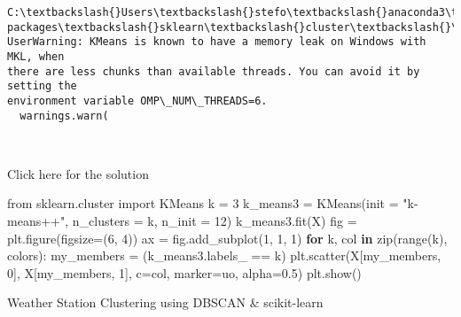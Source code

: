 \documentclass[11pt]{article}
\newenvironment{Shaded}{}{}
\newcommand{\KeywordTok}[1]{\textcolor[rgb]{0.00,0.44,0.13}{\textbf{{#1}}}}
\newcommand{\DecValTok}[1]{\textcolor[rgb]{0.25,0.63,0.44}{{#1}}}
\newcommand{\FloatTok}[1]{\textcolor[rgb]{0.25,0.63,0.44}{{#1}}}
\newcommand{\StringTok}[1]{\textcolor[rgb]{0.25,0.44,0.63}{{#1}}}
\newcommand{\NormalTok}[1]{{#1}}
\newcommand{\ImportTok}[1]{{#1}}
\newcommand{\ControlFlowTok}[1]{\textcolor[rgb]{0.00,0.44,0.13}{\textbf{{#1}}}}
\newcommand{\OperatorTok}[1]{\textcolor[rgb]{0.40,0.40,0.40}{{#1}}}
\newcommand{\BuiltInTok}[1]{{#1}}
\begin{document}
    \begin{Verbatim}[commandchars=\\\{\}]
C:\textbackslash{}Users\textbackslash{}stefo\textbackslash{}anaconda3\textbackslash{}lib\textbackslash{}site-packages\textbackslash{}sklearn\textbackslash{}cluster\textbackslash{}\_kmeans.py:1334:
UserWarning: KMeans is known to have a memory leak on Windows with MKL, when
there are less chunks than available threads. You can avoid it by setting the
environment variable OMP\_NUM\_THREADS=6.
  warnings.warn(
    \end{Verbatim}

    \begin{center}
    \end{center}
    { \hspace*{\fill} \\}
    
    Click here for the solution

\begin{Shaded}
\begin{Highlighting}[]
\ImportTok{from}\NormalTok{ sklearn.cluster }\ImportTok{import}\NormalTok{ KMeans }
\NormalTok{k }\OperatorTok{=} \DecValTok{3}
\NormalTok{k\_means3 }\OperatorTok{=}\NormalTok{ KMeans(init }\OperatorTok{=} \StringTok{"k{-}means++"}\NormalTok{, n\_clusters }\OperatorTok{=}\NormalTok{ k, n\_init }\OperatorTok{=} \DecValTok{12}\NormalTok{)}
\NormalTok{k\_means3.fit(X)}
\NormalTok{fig }\OperatorTok{=}\NormalTok{ plt.figure(figsize}\OperatorTok{=}\NormalTok{(}\DecValTok{6}\NormalTok{, }\DecValTok{4}\NormalTok{))}
\NormalTok{ax }\OperatorTok{=}\NormalTok{ fig.add\_subplot(}\DecValTok{1}\NormalTok{, }\DecValTok{1}\NormalTok{, }\DecValTok{1}\NormalTok{)}
\ControlFlowTok{for}\NormalTok{ k, col }\KeywordTok{in} \BuiltInTok{zip}\NormalTok{(}\BuiltInTok{range}\NormalTok{(k), colors):}
\NormalTok{    my\_members }\OperatorTok{=}\NormalTok{ (k\_means3.labels\_ }\OperatorTok{==}\NormalTok{ k)}
\NormalTok{    plt.scatter(X[my\_members, }\DecValTok{0}\NormalTok{], X[my\_members, }\DecValTok{1}\NormalTok{],  c}\OperatorTok{=}\NormalTok{col, marker}\OperatorTok{=}\StringTok{u\textquotesingle{}o\textquotesingle{}}\NormalTok{, alpha}\OperatorTok{=}\FloatTok{0.5}\NormalTok{)}
\NormalTok{plt.show()}
\end{Highlighting}
\end{Shaded}

    Weather Station Clustering using DBSCAN \& scikit-learn
\end{document}
